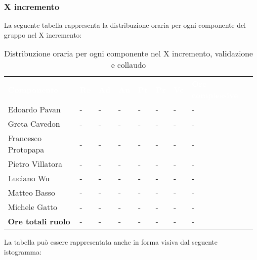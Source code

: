 \subsubsection{X incremento}
La seguente tabella rappresenta la distribuzione oraria per ogni componente del gruppo nel X incremento:
\begin{table}[!htbp]
\begin{center}
\renewcommand{\arraystretch}{1.25}
\begin{tabular}{ m{}<{\centering}  m{}<{\centering} m{}<{\centering} m{}<{\centering}  m{}<{\centering}  m{}<{\centering}  m{}<{\centering}  m{}<{\centering}   }
	\rowcolor{darkblue}
	\textcolor{white}{\textbf{Componente}} &\textcolor{white}{\textbf{Re}}&\textcolor{white}{\textbf{Ad}}&\textcolor{white}{\textbf{An}}&\textcolor{white}{\textbf{Pt}}&\textcolor{white}{\textbf{Pr}}&\textcolor{white}{\textbf{Ve}}&\textcolor{white}{\textbf{Ore complessive}}\\ 

	Edoardo Pavan & - & - & - & - & - & - & -\\	

	\rowcolor{gray!10} Greta Cavedon & - & - & - & - & - & - & -\\
	
	Francesco Protopapa & - & - & - & - & - & - & -\\
	
	\rowcolor{gray!10} Pietro Villatora & - & - & - & - & - & - & -\\
	
	Luciano Wu & - & - & - & - & - & - & -\\
	
	\rowcolor{gray!10} Matteo Basso & - & - & - & - & - & - & -\\
	
	Michele Gatto & - & - & - & - & - & - & -\\
	
	\rowcolor{gray!10} \textbf{Ore totali ruolo} & - & - & - & - & - & - & -\\

\end{tabular}
\caption{Distribuzione oraria per ogni componente nel X incremento,  validazione e collaudo}
\end{center}
\end{table}

La tabella può essere rappresentata anche in forma visiva dal seguente istogramma:

